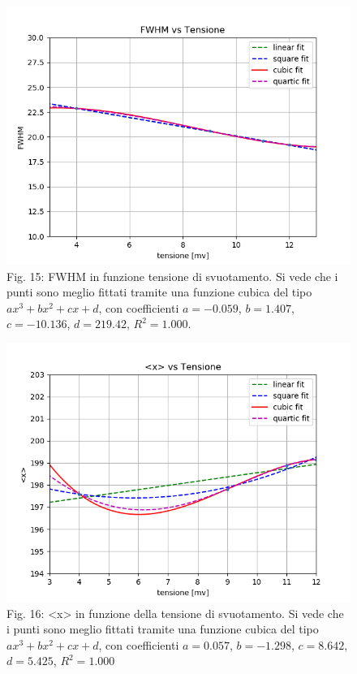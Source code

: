 \documentclass[a4paper]{article}
\begin{document}
\begin{figure}[H]
\includegraphics[width=1\textwidth]{FWHM_vs_Tensione}
        \caption{Fig. 15: FWHM in funzione tensione di svuotamento. Si vede che i punti sono meglio fittati tramite una funzione cubica del tipo $ax^3+bx^2+cx+d$, con coefficienti $a=-0.059$, $b=1.407$, $c=-10.136$, $d=219.42$, $R^2= 1.000$.}
        \label{fig:15}
\end{figure}

\begin{figure}[H]
\includegraphics[width=1\textwidth]{x_vs_Tensione}
        \caption{Fig. 16: <x> in funzione della tensione di svuotamento. Si vede che i punti sono meglio fittati tramite una funzione cubica del tipo $ax^3+bx^2+cx+d$, con coefficienti $a=0.057$, $b=-1.298$, $c=8.642$, $d=5.425$, $R^2= 1.000$}
        \label{fig:16}
\end{figure}
\newpage
\end{document}
